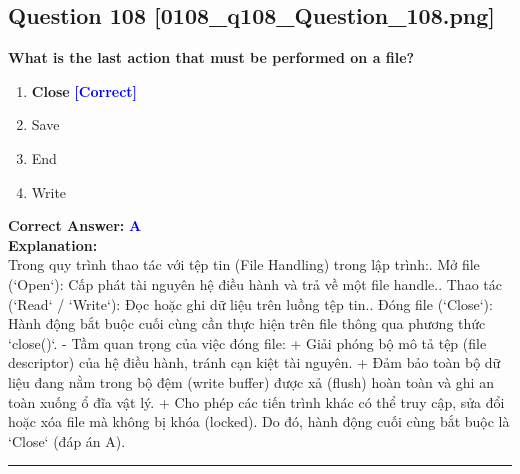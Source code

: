 \documentclass[11pt,a4paper]{article}
\begin{document}
\begin{minipage}{\textwidth}
\subsection*{Question 108 \quad \footnotesize{[0108_q108_Question_108.png]}}
\noindent \textbf{What is the last action that must be performed on a file?}

\begin{enumerate}[label=\Alph*.]
    \item \textbf{Close} \hfill \textcolor{blue}{\textbf{[Correct]}}
    \item Save
    \item End
    \item Write
\end{enumerate}

\noindent \textbf{Correct Answer:} \textcolor{blue}{\textbf{A}} \\[4pt]
\noindent \textbf{Explanation:}\\
Trong quy trình thao tác với tệp tin (File Handling) trong lập trình:. Mở file (`Open`): Cấp phát tài nguyên hệ điều hành và trả về một file handle.. Thao tác (`Read` / `Write`): Đọc hoặc ghi dữ liệu trên luồng tệp tin.. Đóng file (`Close`): Hành động bắt buộc cuối cùng cần thực hiện trên file thông qua phương thức `close()`.\newline
- Tầm quan trọng của việc đóng file:\newline
  + Giải phóng bộ mô tả tệp (file descriptor) của hệ điều hành, tránh cạn kiệt tài nguyên.\newline
  + Đảm bảo toàn bộ dữ liệu đang nằm trong bộ đệm (write buffer) được xả (flush) hoàn toàn và ghi an toàn xuống ổ đĩa vật lý.\newline
  + Cho phép các tiến trình khác có thể truy cập, sửa đổi hoặc xóa file mà không bị khóa (locked).\newline
Do đó, hành động cuối cùng bắt buộc là `Close` (đáp án A).
\end{minipage}
\vspace{0.8cm}
\hrule
\vspace{0.5cm}
\end{document}
